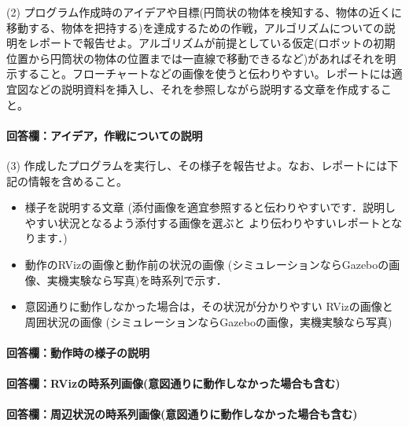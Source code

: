\documentclass[12pt, xelatex,ja=standard,jafont=noto]{bxjsarticle}
\newif\ifdraft
\begin{document}
\begin{itembox}[l]{(2)}
プログラム作成時のアイデアや目標(円筒状の物体を検知する、物体の近くに移動する、物体を把持する)を達成するための作戦，アルゴリズムについての説明をレポートで報告せよ。アルゴリズムが前提としている仮定(ロボットの初期位置から円筒状の物体の位置までは一直線で移動できるなど)があればそれを明示すること。フローチャートなどの画像を使うと伝わりやすい。レポートには適宜図などの説明資料を挿入し、それを参照しながら説明する文章を作成すること。
\end{itembox}

\paragraph{回答欄：アイデア，作戦についての説明}
\ifdraft
アイデアや作戦について図や画像を交えながら詳しく説明する．
\fi

\begin{itembox}[l]{(3)}
作成したプログラムを実行し、その様子を報告せよ。なお、レポートには下記の情報を含めること。
\begin{itemize}
    \item 様子を説明する文章 (添付画像を適宜参照すると伝わりやすいです．説明しやすい状況となるよう添付する画像を選ぶと より伝わりやすいレポートとなります．)
    \item 動作のRVizの画像と動作前の状況の画像 (シミュレーションならGazeboの画像、実機実験なら写真)を時系列で示す．
    \item 意図通りに動作しなかった場合は，その状況が分かりやすい RVizの画像と周囲状況の画像 (シミュレーションならGazeboの画像，実機実験なら写真)
\end{itemize}
\end{itembox}

\paragraph{回答欄：動作時の様子の説明}
\ifdraft
動作時の様子を説明する文章を記載する．
\fi

\paragraph{回答欄：RVizの時系列画像(意図通りに動作しなかった場合も含む)}
\ifdraft
RVizの時系列画像を貼り付ける
\fi

\paragraph{回答欄：周辺状況の時系列画像(意図通りに動作しなかった場合も含む)}
\ifdraft
周辺状況の時系列画像を貼り付ける
\fi
\end{document}
